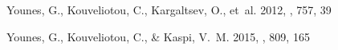 \documentclass[twocolumn]{aastex6}
\begin{document}
\begin{thebibliography}{68}
{Younes}, G., {Kouveliotou}, C., {Kargaltsev}, O., {et~al.} 2012, \apj, 757, 39

{Younes}, G., {Kouveliotou}, C., \& {Kaspi}, V.~M. 2015{}, \apj,
  809, 165

\end{thebibliography}
\end{document}
